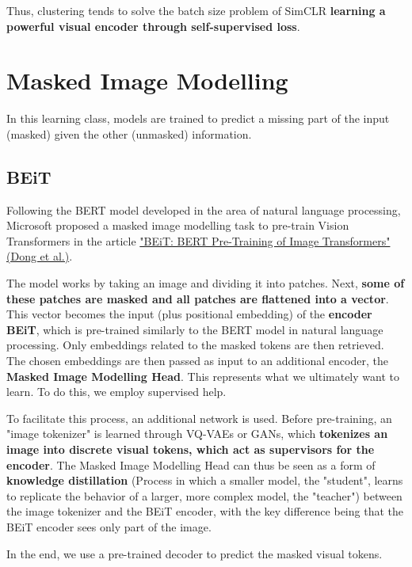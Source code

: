 Thus, clustering tends to solve the batch size problem of SimCLR \textbf{learning a powerful visual encoder through self-supervised loss}.


\section{Masked Image Modelling}

In this learning class, models are trained to predict a missing part of the input (masked) given the other (unmasked) information.

\subsection{BEiT}

Following the BERT model developed in the area of natural language processing, Microsoft proposed a masked image modelling task to pre-train Vision Transformers in the article \href{https://arxiv.org/pdf/2106.08254}{"BEiT: BERT Pre-Training of Image Transformers" (Dong et al.)}.

The model works by taking an image and dividing it into patches. Next, \textbf{some of these patches are masked and all patches are flattened into a vector}. This vector becomes the input (plus positional embedding) of the \textbf{encoder BEiT}, which is pre-trained similarly to the BERT model in natural language processing. Only embeddings related to the masked tokens are then retrieved. The chosen embeddings are then passed as input to an additional encoder, the \textbf{Masked Image Modelling Head}. This represents what we ultimately want to learn. To do this, we employ supervised help.

To facilitate this process, an additional network is used. Before pre-training, an "image tokenizer" is learned through VQ-VAEs or GANs, which \textbf{tokenizes an image into discrete visual tokens, which act as supervisors for the encoder}. The Masked Image Modelling Head can thus be seen as a form of \textbf{knowledge distillation} (Process in which a smaller model, the "student", learns to replicate the behavior of a larger, more complex model, the "teacher") between the image tokenizer and the BEiT encoder, with the key difference being that the BEiT encoder sees only part of the image.

In the end, we use a pre-trained decoder to predict the masked visual tokens.


